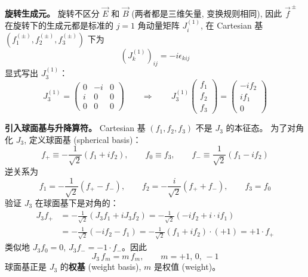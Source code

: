 \textbf{旋转生成元。}
旋转不区分 $\vec{E}$ 和 $\vec{B}$ (两者都是三维矢量, 变换规则相同),
因此 $\vec{f}^{\,\pm}$ 在旋转下的生成元都是标准的 $j=1$ 角动量矩阵 $J_i^{(1)}$,
在 Cartesian 基 $(f^{(\pm)}_1, f^{(\pm)}_2, f^{(\pm)}_3)$ 下为
\begin{equation}
    (J^{(1)}_k)_{ij} = -i\epsilon_{kij}
\end{equation}
显式写出 $J^{(1)}_3$：
\begin{equation}
    J^{(1)}_3 = \begin{pmatrix} 0 & -i & 0 \\ i & 0 & 0 \\ 0 & 0 & 0 \end{pmatrix}
    \qquad\Longrightarrow\qquad
    J^{(1)}_3 \begin{pmatrix} f_1 \\ f_2 \\ f_3 \end{pmatrix}
    = \begin{pmatrix} -if_2 \\ if_1 \\ 0 \end{pmatrix}
\end{equation}

\textbf{引入球面基与升降算符。}
Cartesian 基 $(f_1,f_2,f_3)$ 不是 $J_3$ 的本征态。
为了对角化 $J_3$, 定义球面基 (spherical basis)：
\begin{equation}
    f_+ \equiv -\frac{1}{\sqrt{2}}(f_1 + if_2), \qquad
    f_0 \equiv f_3, \qquad
    f_- \equiv \frac{1}{\sqrt{2}}(f_1 - if_2)
    \label{eq:spherical-basis-def}
\end{equation}
逆关系为
\begin{equation}
    f_1 = -\frac{1}{\sqrt{2}}(f_+ - f_-), \qquad
    f_2 = -\frac{i}{\sqrt{2}}(f_+ + f_-), \qquad
    f_3 = f_0
    \label{eq:spherical-basis-inv}
\end{equation}
验证 $J_3$ 在球面基下是对角的：
\begin{align}
    J_3 f_+ &= -\frac{1}{\sqrt{2}}(J_3 f_1 + iJ_3 f_2)
    = -\frac{1}{\sqrt{2}}(-if_2 + i\cdot if_1) \nonumber\\
    &= -\frac{1}{\sqrt{2}}(-if_2 - f_1)
    = -\frac{1}{\sqrt{2}}(f_1 + if_2) \cdot (+1) = +1\cdot f_+
\end{align}
类似地 $J_3 f_0 = 0$, $J_3 f_- = -1\cdot f_-$。因此
\begin{equation}
    \boxed{J_3\,f_m = m\,f_m, \qquad m = +1,\,0,\,-1}
    \label{eq:J3-diag}
\end{equation}
球面基正是 $J_3$ 的\textbf{权基} (weight basis), $m$ 是权值 (weight)。

